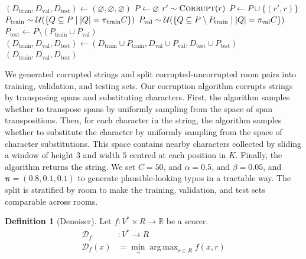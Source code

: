 \documentclass{article}
\theoremstyle{definition}
\newtheorem{definition}{Definition}
\DeclareMathOperator*{\argmax}{arg\,max}
\newcommand{\R}{\mathbb{R}}
\begin{document}
\begin{algorithm}[H]
	\caption{$\textsc{Split}()$}
	\begin{algorithmic}
		\State ${
			(D_\mathrm{train},D_\mathrm{val},D_\mathrm{test})
			\gets
			(\varnothing,\varnothing,\varnothing)
		}$
			\State $P\gets\varnothing$
				\State $r'\sim\textsc{Corrupt}(r)$
					$P\gets P\cup\{(r',r)\}$
				\EndIf
			\EndWhile
			\State ${
				P_\mathrm{train}
				\sim
				\mathcal{U}(\{Q\subseteq P\mid \abs{Q}=\pi_\mathrm{train}C\})
			}$
			\State ${
				P_\mathrm{val}
				\sim
				\mathcal{U}(\{Q\subseteq P\setminus P_\mathrm{train}\mid \abs{Q}=\pi_\mathrm{val}C\})
			}$
			\State ${
				P_\mathrm{test}
				\gets
				P\setminus(P_\mathrm{train}\cup P_\mathrm{val})
			}$
			\State ${
				(D_\mathrm{train},D_\mathrm{val},D_\mathrm{test})
				\gets
				(
					D_\mathrm{train}\cup P_\mathrm{train},
					D_\mathrm{val}\cup P_\mathrm{val},
					D_\mathrm{test}\cup P_\mathrm{test}
				)
			}$
		\EndFor
		\State \Return $(D_\mathrm{train},D_\mathrm{val},D_\mathrm{test})$
	\end{algorithmic}
\end{algorithm}

We generated corrupted strings
and split corrupted-uncorrupted room pairs
into training, validation, and testing sets.
Our corruption algorithm corrupts strings by transposing spans and substituting characters.
First, the algorithm samples whether to transpose spans by uniformly sampling from the space of span transpositions.
Then, for each character in the string, the algorithm samples whether to substitute the character by uniformly sampling from the space of character substitutions.
This space contains nearby characters collected by sliding a window of height $3$ and width $5$ centred at each position in $K$.
Finally, the algorithm returns the string.
We set $C=50$, and $\alpha=0.5$, and $\beta=0.05$, and $\bm{\pi}=(0.8,0.1,0.1)$
to generate plausible-looking typos in a tractable way.
The split is stratified by room to make the training, validation, and test sets comparable across rooms.

\newpage

\begin{definition}[Denoiser]
Let $f:V^{*}\times R\to\R$ be a scorer.
\begin{align*}
	\mathscr{D}_{f}
	&:
	V^{*}\to R
	\\
	\mathscr{D}_{f}(x)
	&=
	\min_{\prec}
	\argmax_{r\in R}
	f(x,r)
\end{align*}
\end{definition}
\end{document}
